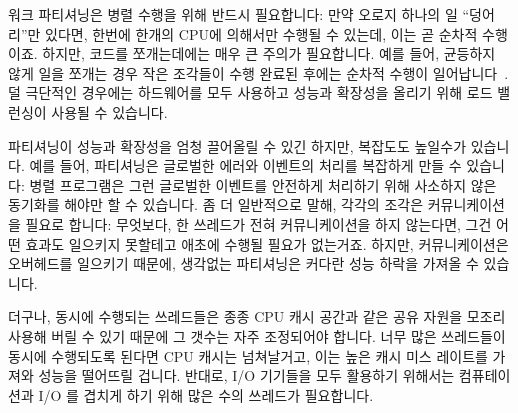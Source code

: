 워크 파티셔닝은 병렬 수행을 위해 반드시 필요합니다:
만약 오로지 하나의 일 ``덩어리''만 있다면, 한번에 한개의 CPU에 의해서만 수행될
수 있는데, 이는 곧 순차적 수행이죠.
하지만, 코드를 쪼개는데에는 매우 큰 주의가 필요합니다.
예를 들어, 균등하지 않게 일을 쪼개는 경우 작은 조각들이 수행 완료된 후에는
순차적 수행이 일어납니다~\cite{GeneAmdahl1967AmdahlsLaw}.
덜 극단적인 경우에는 하드웨어를 모두 사용하고 성능과 확장성을 올리기 위해 로드
밸런싱이 사용될 수 있습니다.

파티셔닝이 성능과 확장성을 엄청 끌어올릴 수 있긴 하지만, 복잡도도 높일수가
있습니다.
예를 들어, 파티셔닝은 글로벌한 에러와 이벤트의 처리를 복잡하게 만들 수
있습니다:
병렬 프로그램은 그런 글로벌한 이벤트를 안전하게 처리하기 위해 사소하지 않은
동기화를 해야만 할 수 있습니다.
좀 더 일반적으로 말해, 각각의 조각은 커뮤니케이션을 필요로 합니다:
무엇보다, 한 쓰레드가 전혀 커뮤니케이션을 하지 않는다면, 그건 어떤 효과도
일으키지 못할테고 애초에 수행될 필요가 없는거죠.
하지만, 커뮤니케이션은 오버헤드를 일으키기 때문에, 생각없는 파티셔닝은 커다란
성능 하락을 가져올 수 있습니다.

더구나, 동시에 수행되는 쓰레드들은 종종 CPU 캐시 공간과 같은 공유 자원을 모조리
사용해 버릴 수 있기 때문에 그 갯수는 자주 조정되어야 합니다.
너무 많은 쓰레드들이 동시에 수행되도록 된다면 CPU 캐시는 넘쳐날거고, 이는 높은
캐시 미스 레이트를 가져와 성능을 떨어뜨릴 겁니다.
반대로, I/O 기기들을 모두 활용하기 위해서는 컴퓨테이션과 I/O 를 겹치게 하기
위해 많은 수의 쓰레드가 필요합니다.

